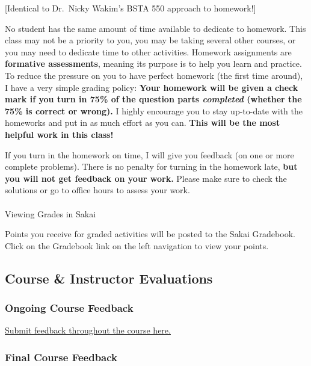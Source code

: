 \documentclass[
  letterpaper,
  DIV=11,
  numbers=noendperiod]{scrartcl}
\makeatletter
\let\oldparagraph\paragraph
\renewcommand{\paragraph}{
    \@ifstar
      \xxxParagraphStar
      \xxxParagraphNoStar
  }
\newcommand{\xxxParagraphStar}[1]{\oldparagraph*{#1}\mbox{}}
\newcommand{\xxxParagraphNoStar}[1]{\oldparagraph{#1}\mbox{}}
\makeatother
\begin{document}
{[}Identical to Dr.~Nicky Wakim's BSTA 550 approach to homework!{]}

No student has the same amount of time available to dedicate to
homework. This class may not be a priority to you, you may be taking
several other courses, or you may need to dedicate time to other
activities. Homework assignments are \textbf{formative assessments},
meaning its purpose is to help you learn and practice. To reduce the
pressure on you to have perfect homework (the first time around), I have
a very simple grading policy: \textbf{Your homework will be given a
check mark if you turn in 75\% of the question parts \emph{completed}
(whether the 75\% is correct or wrong).} I highly encourage you to stay
up-to-date with the homeworks and put in as much effort as you can.
\textbf{This will be the most helpful work in this class!}

If you turn in the homework on time, I will give you feedback (on one or
more complete problems). There is no penalty for turning in the homework
late, \textbf{but you will not get feedback on your work.} Please make
sure to check the solutions or go to office hours to assess your work.

\paragraph{Viewing Grades in Sakai}\label{viewing-grades-in-sakai}

Points you receive for graded activities will be posted to the Sakai
Gradebook. Click on the Gradebook link on the left navigation to view
your points.

\subsection{Course \& Instructor
Evaluations}\label{course-instructor-evaluations}

\subsubsection{Ongoing Course Feedback}\label{ongoing-course-feedback}

\href{https://forms.office.com/r/2yhdKvbkNX}{Submit feedback throughout
the course here.}

\subsubsection{Final Course Feedback}\label{final-course-feedback}
\end{document}
